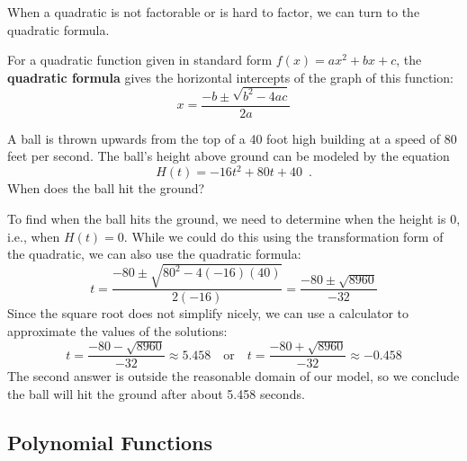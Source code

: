 When a quadratic is not factorable or is hard to factor, we can turn to the quadratic formula.

\begin{theorem}
For a quadratic function given in standard form $f(x)=ax^2+bx+c$, the {\bf quadratic formula} gives the horizontal intercepts of the graph of this function:
\[ x=\dfrac{-b\pm \sqrt{b^2-4ac}}{2a} \]
\end{theorem}

\begin{example}
A ball is thrown upwards from the top of a 40 foot high building at a speed of 80 feet per second. The ball's height above ground can be modeled by the equation
$$H(t)=-16t^2+80t+40 \enspace .$$
When does the ball hit the ground?

\begin{solution} To find when the ball hits the ground, we need to determine when the height is 0, i.e., when $H(t)=0$. While we could do this using the transformation form of the quadratic, we can also use the quadratic formula:
\[ t=\dfrac{-80\pm \sqrt{80^2-4(-16)(40)}}{2(-16)}=\dfrac{-80\pm\sqrt{8960}}{-32} \]
Since the square root does not simplify nicely, we can use a calculator to approximate the values of the solutions:
\[ t=\dfrac{-80-\sqrt{8960}}{-32}\approx 5.458 \quad\text{or}\quad t=\dfrac{-80+\sqrt{8960}}{-32}\approx -0.458 \]
The second answer is outside the reasonable domain of our model, so we conclude the ball will hit the ground after about 5.458 seconds.
\end{solution}\end{example}

\subsection{Polynomial Functions}
\label{ssec:polynomial}

